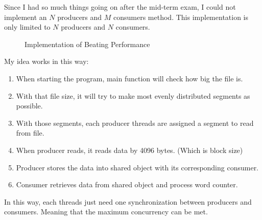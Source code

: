 \documentclass{homework}
\begin{document}
Since I had so much things going on after the mid-term exam, I could not implement an $N$ producers and $M$ consumers method. This implementation is only limited to $N$ producers and $N$ consumers. 

\begin{figure}[h]
  \centering
  
  \caption{Implementation of Beating Performance}
\end{figure}

My idea works in this way:
\begin{enumerate}
   \item When starting the program, main function will check how big the file is.
   \item With that file size, it will try to make most evenly distributed segments as possible.
   \item With those segments, each producer threads are assigned a segment to read from file.
   \item When producer reads, it reads data by 4096 bytes. (Which is block size)
   \item Producer stores the data into shared object with its corresponding consumer.
   \item Consumer retrieves data from shared object and process word counter.
\end{enumerate}

In this way, each threads just need one synchronization between producers and consumers. Meaning that the maximum concurrency can be met.
\end{document}
